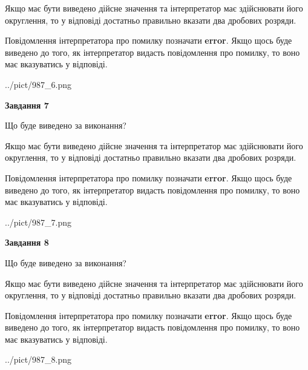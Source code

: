 \documentclass[12pt, ukrainian]{article}
\begin{document}
{\begin {Large}
Якщо має бути виведено дійсне значення та інтерпретатор має здійснювати його округлення, 
то у відповіді достатньо правильно вказати два дробових розряди.

Повідомлення інтерпретатора про помилку позначати \textbf{error}.
Якщо щось буде виведено до того, як інтерпретатор видасть повідомлення про помилку, 
то воно має вказуватись у відповіді. \par

\begin{center}
	{../pict/987_6.png}
\end{center}
\newpage

{\begin {center}\textbf{Завдання 7}\end {center}}\par
Що буде виведено за виконання? \par

Якщо має бути виведено дійсне значення та інтерпретатор має здійснювати його округлення, 
то у відповіді достатньо правильно вказати два дробових розряди.

Повідомлення інтерпретатора про помилку позначати \textbf{error}.
Якщо щось буде виведено до того, як інтерпретатор видасть повідомлення про помилку, 
то воно має вказуватись у відповіді. \par

\begin{center}
	{../pict/987_7.png}
\end{center}
\newpage

{\begin {center}\textbf{Завдання 8}\end {center}}\par
Що буде виведено за виконання? \par

Якщо має бути виведено дійсне значення та інтерпретатор має здійснювати його округлення, 
то у відповіді достатньо правильно вказати два дробових розряди.

Повідомлення інтерпретатора про помилку позначати \textbf{error}.
Якщо щось буде виведено до того, як інтерпретатор видасть повідомлення про помилку, 
то воно має вказуватись у відповіді. \par

\begin{center}
	{../pict/987_8.png}
\end{center}
\newpage


\end{Large}}
\end{document}
